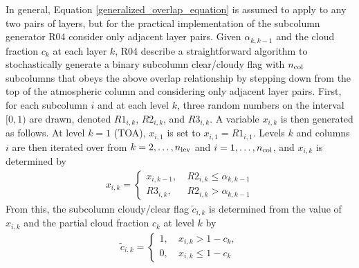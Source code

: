 In general, Equation \ref{generalized_overlap_equation} is assumed to apply to any two pairs of layers, but for the practical implementation of the subcolumn generator R04 consider only adjacent layer pairs. Given $\alpha_{k, k-1}$ and the cloud fraction $c_{k}$ at each layer $k$, R04 describe a straightforward algorithm to stochastically generate a binary subcolumn clear/cloudy flag with $n_{\rm col}$ subcolumns that obeys the above overlap relationship by stepping down from the top of the atmospheric column and considering only adjacent layer pairs. First, for each subcolumn $i$ and at each level $k$, three random numbers on the interval $[0, 1)$ are drawn, denoted $R1_{i, k}$, $R2_{i, k}$, and $R3_{i, k}$. A variable $x_{i, k}$ is then generated as follows. At level $k = 1$ (TOA), $x_{i, 1}$ is set to $x_{i, 1} = R1_{i, 1}$. Levels $k$ and columns $i$ are then iterated over from $k = 2, \ldots, n_{\rm lev}$ and $i = 1, \ldots, n_{\rm col}$, and $x_{i, k}$ is determined by
\begin{align}
    x_{i, k} = \begin{cases} 
        x_{i, k-1}, ~ & R2_{i, k} \le \alpha_{k, k-1} \\
        R3_{i, k}, ~ & R2_{i, k} > \alpha_{k, k-1}
    \end{cases}
\end{align}
From this, the subcolumn cloudy/clear flag $\tilde{c}_{i, k}$ is determined from the value of $x_{i, k}$ and the partial cloud fraction $c_{k}$ at level $k$ by
\begin{align}
    \tilde{c}_{i, k} = \begin{cases}
        1, ~ & x_{i, k} > 1 - c_{k}, \\
        0, ~ & x_{i, k} \le 1 - c_{k}
    \end{cases}
\end{align}

